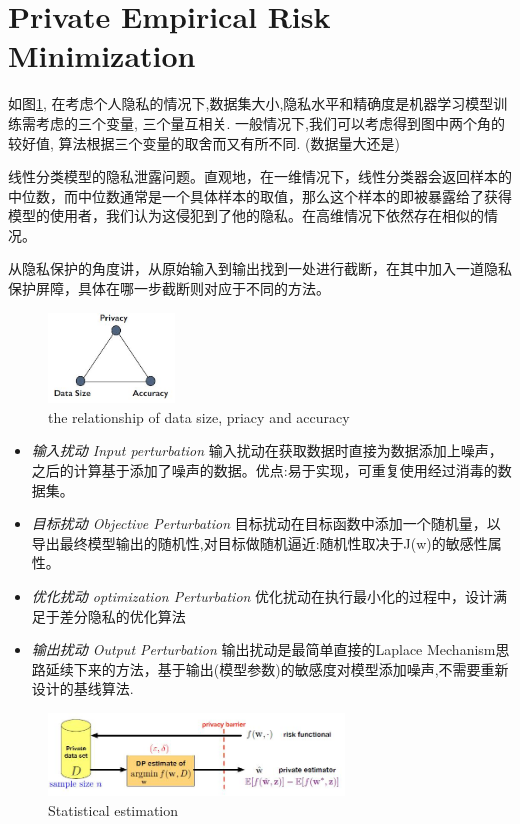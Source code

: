 \section{Private Empirical Risk Minimization}
 
如图\ref{fig:privacy_data_accuracy}, 在考虑个人隐私的情况下,数据集大小,隐私水平和精确度是机器学习模型训练需考虑的三个变量, 三个量互相关.
一般情况下,我们可以考虑得到图中两个角的较好值, 算法根据三个变量的取舍而又有所不同. (数据量大还是)

线性分类模型的隐私泄露问题。直观地，在一维情况下，线性分类器会返回样本的中位数，而中位数通常是一个具体样本的取值，那么这个样本的即被暴露给了获得模型的使用者，我们认为这侵犯到了他的隐私。在高维情况下依然存在相似的情况。\cite{kasiviswanathan2012power}

从隐私保护的角度讲，从原始输入到输出找到一处进行截断，在其中加入一道隐私保护屏障，具体在哪一步截断则对应于不同的方法。
\begin{figure}
    \centering
    \label{fig:privacy_data_accuracy}
    \includegraphics[width=0.3\textwidth]{figures/priacy_data_accuracy.jpg}
    \caption{the relationship of data size, priacy and accuracy}
\end{figure}
\begin{itemize}
    \item \emph{输入扰动 Input perturbation} 输入扰动在获取数据时直接为数据添加上噪声，之后的计算基于添加了噪声的数据。优点:易于实现，可重复使用经过消毒的数据集。\cite{DJW13,KTS17}
    \item \emph{目标扰动 Objective Perturbation} 目标扰动在目标函数中添加一个随机量，以导出最终模型输出的随机性,对目标做随机逼近:随机性取决于J(w)的敏感性属性。 \cite{CMS11,ZZXYW12}
    \item \emph{优化扰动 optimization Perturbation} 优化扰动在执行最小化的过程中，设计满足于差分隐私的优化算法
    \item \emph{输出扰动 Output Perturbation } 输出扰动是最简单直接的Laplace Mechanism思路延续下来的方法，基于输出(模型参数)的敏感度对模型添加噪声,不需要重新设计的基线算法. \cite{CMS11,RBHT12}
\end{itemize}
 
\begin{figure}
    \centering
    \label{fig:estimation_prediction}
    \includegraphics[width=0.7\textwidth]{figures/estimation_prediction.jpg}
    \caption{Statistical estimation}
\end{figure}

